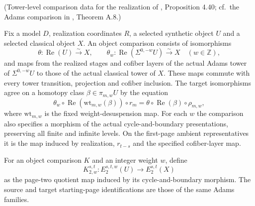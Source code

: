 \begin{definition}
\label{sem:Literature:lambda-inversion-object-comparison}
(Tower-level comparison data for the realization of \cite{Pst}, Proposition 4.40; cf.\ the Adams comparison in \cite{BHS}, Theorem A.8.)\par{}

Fix a model $D$, realization coordinates $R$, a selected synthetic object
$U$ and a selected classical object $X$. An object comparison consists
of isomorphisms
\[
\theta:\operatorname{Re}(U)\xrightarrow{\sim}X,\qquad
\theta_w:\operatorname{Re}(\Sigma^{0,-w}U)\xrightarrow{\sim}X
\quad(w\in\mathbb Z),
\]
and maps from the realized stages and cofiber layers of the actual Adams
tower of $\Sigma^{0,-w}U$ to those of the actual classical tower of $X$.
These maps commute with every tower transition, projection and cofiber
inclusion. The target isomorphisms agree on a homotopy class
$\beta\in\pi_{m,w}U$ by the equation
\[
\theta_w\circ\operatorname{Re}(\mathrm{wt}_{m,w}(\beta))\circ r_m
 =\theta\circ\operatorname{Re}(\beta)\circ\rho_{m,w},
\]
where $\mathrm{wt}_{m,w}$ is the fixed weight-desuspension map.
For each $w$ the comparison also specifies a morphism of the actual
cycle-and-boundary presentations, preserving all finite and infinite
levels. On the first-page ambient representatives it is the map induced
by realization, $r_{t-s}$ and the specified cofiber-layer map.
\end{definition}

\begin{definition}
\label{sem:Literature:lambda-inversion-e2-map}
For an object comparison $K$ and an integer weight $w$, define
\[
K_{2,w}^{s,t}:E_2^{s,t,w}(U)\longrightarrow E_2^{s,t}(X)
\]
as the page-two quotient map induced by its cycle-and-boundary morphism.
The source and target starting-page identifications are those of the
same Adams families.
\end{definition}

